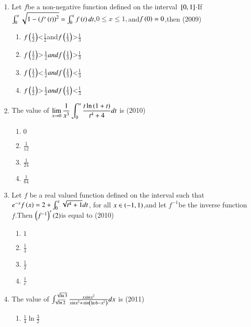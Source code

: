 \documentclass[journal,12pt,twocolumn]{IEEEtran}
\theoremstyle{remark}
\begin{document}
\begin{enumerate}[start=21]
\item Let $f$be a non-negative function defined on the interval ${}\left[0,1\right]$$\cdot$If$\int_{0}^{x}\sqrt{1-\left(f'\left(t\right)\right)^2}=\int_{0}^{x}f\left(t\right)dt,$$    0\leq x \leq 1,$and$f\left(0\right)=0$,then
\hfill{(2009)}
\begin{enumerate}
\item $f\left(\frac{1}{2}\right)$\textless$\frac{1}{2}$and$f\left(\frac{1}{3}\right)$\textgreater$\frac{1}{3}$
\item$f\left(\frac{1}{2}\right)$\textgreater$\frac{1}{2}andf\left(\frac{1}{3}\right)$\textgreater$\frac{1}{3}$
\item$f\left(\frac{1}{2}\right)$\textless$\frac{1}{2}andf\left(\frac{1}{3}\right)$\textless$\frac{1}{3}$
\item $f\left(\frac{1}{2}\right)$\textgreater$\frac{1}{2}andf\left(\frac{1}{3}\right)$\textless$\frac{1}{3}$
\end{enumerate}
\item The value of $\displaystyle\lim_{x\to0}\frac{1}{x^3}\int_{0}^{x}\frac{t\ln\left(1+t\right)}{t^4 +4}dt$ is
\hfill{(2010)}
\begin{enumerate}
\item $0$
\item $\frac{1}{12}$
\item$\frac{1}{24}$\item$\frac{1}{64}$
\end{enumerate}
\item Let $f$ be a real valued function defined on the interval  such that $e^{-x}f\left(x\right)=2+\int_{0}^{x}\sqrt{t^4 +1}dt$, for all $x\in\left(-1,1\right)$,and let $f^{-1}$be the inverse function $f$.Then $\left(f^{-1}\right)'(2)$is equal to
\hfill{(2010)}
\begin{enumerate}
\item $1$
\item$\frac{1}{3} $
\item $\frac{1}{2}$
\item $\frac{1}{e}$
\end{enumerate}
\item The value of $\int_{\sqrt{\ln 2}}^{\sqrt{\ln 3}}\frac{xsinx^2}{sinx^2 + sin\left(\ln 6-x^2\right)}dx$ is
\hfill{(2011)}
\begin{enumerate}
\item $\frac{1}{4}\ln \frac{3}{2}$

\end{enumerate}
\end{enumerate}
\end{document}
